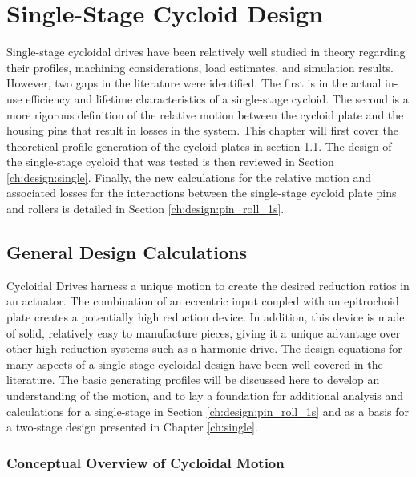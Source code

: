 
\chapter{Single-Stage Cycloid Design}\label{ch:design_1s}

Single-stage cycloidal drives have been relatively well studied in theory regarding their profiles, machining considerations, load estimates, and simulation results. However, two gaps in the literature were identified. The first is in the actual in-use efficiency and lifetime characteristics of a single-stage cycloid. The second is a more rigorous definition of the relative motion between the cycloid plate and the housing pins that result in losses in the system. This chapter will first cover the theoretical profile generation of the cycloid plates in section \ref{ch:design:basic_calc}. The design of the single-stage cycloid that was tested is then reviewed in Section \ref{ch:design:single}. Finally, the new calculations for the relative motion and associated losses for the interactions between the single-stage cycloid plate pins and rollers is detailed in Section \ref{ch:design:pin_roll_1s}.

\section{General Design Calculations} \label{ch:design:basic_calc}

Cycloidal Drives harness a unique motion to create the desired reduction ratios in an actuator. The combination of an eccentric input coupled with an epitrochoid plate creates a potentially high reduction device. In addition, this device is made of solid, relatively easy to manufacture pieces, giving it a unique advantage over other high reduction systems such as a harmonic drive. The design equations for many aspects of a single-stage cycloidal design have been well covered in the literature. The basic generating profiles will be discussed here to develop an understanding of the motion, and to lay a foundation for additional analysis and calculations for a single-stage in Section \ref{ch:design:pin_roll_1s} and as a basis for a two-stage design presented in Chapter \ref{ch:single}. 

\subsection{Conceptual Overview of Cycloidal Motion} \label{ch:design:basic_calc:overview}

